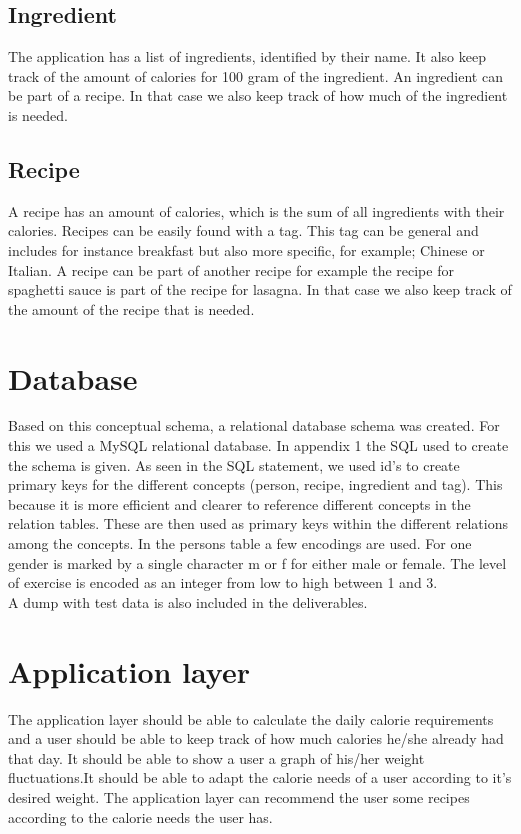 \subsection{Ingredient}
The application has a list of ingredients, identified by their name. It also keep track of the amount of calories for 100 gram of the ingredient. An ingredient can be part of a recipe. In that case we also keep track of how much of the ingredient is needed.

\subsection{Recipe}
 A recipe has an amount of calories, which is the sum of all ingredients with their calories. Recipes can be easily found with a tag. This tag can be general and includes for instance breakfast but also more specific, for example; Chinese or Italian. A recipe can be part of another recipe for example the recipe for spaghetti sauce is part of the recipe for lasagna. In that case we also keep track of the amount of the recipe that is needed.   


\section{Database}
Based on this conceptual schema, a relational database schema was created. For this we used a MySQL relational database. In appendix 1 the SQL used to create the schema is given. As seen in the SQL statement, we used id's to create primary keys for the different concepts (person, recipe, ingredient and tag). This because it is more efficient and clearer to reference different concepts in the relation tables. These are then used as primary keys within the different relations among the concepts. In the persons table a few encodings are used. For one gender is marked by a single character m or f for either male or female. The level of exercise is encoded as an integer from low to high between 1 and 3.\\
A dump with test data is also included in the deliverables. 

\section{Application layer}
The application layer should be able to calculate the daily calorie requirements and a user should be able to keep track of how much calories he/she already had that day. It should be able to show a user a graph of his/her weight fluctuations.It should be able to adapt the calorie needs of a user according to it's desired weight. The application layer can recommend the user some recipes according to the calorie needs the user has.

